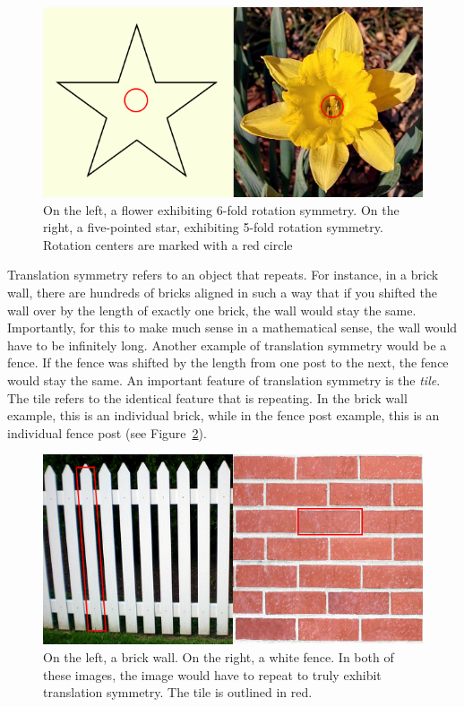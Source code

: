 \begin{figure}
\centering
\includegraphics[width=0.9\columnwidth]{rotation}
\caption{On the left, a flower exhibiting 6-fold rotation symmetry. On the right, a five-pointed star, exhibiting 5-fold rotation symmetry. Rotation centers are marked with a red circle}
\label{rot}
\end{figure}

Translation symmetry refers to an object that repeats. For instance, in a brick wall, there are hundreds of bricks aligned in such a way that if you shifted the wall over by the length of exactly one brick, the wall would stay the same. Importantly, for this to make much sense in a mathematical sense, the wall would have to be infinitely long. Another example of translation symmetry would be a fence. If the fence was shifted by the length from one post to the next, the fence would stay the same. An important feature of translation symmetry is the \textit{tile}. The tile refers to the identical feature that is repeating. In the brick wall example, this is an individual brick, while in the fence post example, this is an individual fence post (see Figure~\ref{trans}).

\begin{figure}
\centering
\includegraphics[width=0.9\columnwidth]{translation}
\caption{On the left, a brick wall. On the right, a white fence. In both of these images, the image would have to repeat to truly exhibit translation symmetry. The tile is outlined in red.}
\label{trans}
\end{figure}

